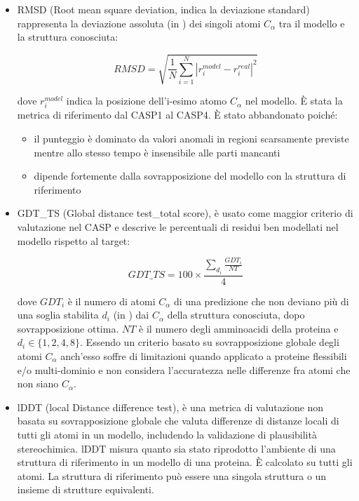 \begin{itemize}
	\item RMSD (Root mean square deviation, indica la deviazione standard) rappresenta la deviazione assoluta (in \angstrom) dei singoli atomi $C_{\alpha}$ tra il modello e la struttura conosciuta:
	
	\[  RMSD = \sqrt{\frac{1}{N} \sum_{i=1}^{N} \left|r_{i}^{model}-r_{i}^{real}\right|^{2}}  \]
	
	dove $r_{i}^{model}$ indica la posizione dell'i-esimo atomo $C_{\alpha}$ nel modello. È stata la metrica di riferimento dal CASP1 al CASP4. È stato abbandonato poiché:
	
	\begin{itemize}
		\item il punteggio è dominato da valori anomali in regioni scarsamente previste mentre allo stesso tempo è insensibile alle parti mancanti 
		\item dipende fortemente dalla sovrapposizione del modello con la struttura di riferimento
	\end{itemize}
	
	\item GDT\_TS (Global distance test\_total score), è usato come maggior criterio di valutazione nel CASP e descrive le percentuali di residui ben modellati nel modello rispetto al target:
	
	\[ GDT\_TS = 100 \times \frac{\sum_{d_{i}} \frac{GDT_{i}}{NT}} {4} \]
	
	dove $GDT_{i}$ è il numero di atomi $C_{\alpha}$ di una predizione che non deviano più di una soglia stabilita $d_{i}$ (in \angstrom) dai $C_{\alpha}$ della struttura conosciuta, dopo sovrapposizione ottima. $NT$ è il numero degli amminoacidi della proteina e $d_{i} \in \{1,2,4,8\}$. Essendo un criterio basato su sovrapposizione globale degli atomi $C_{\alpha}$ anch'esso soffre di limitazioni quando applicato a proteine flessibili e/o multi-dominio e non considera l'accuratezza nelle differenze fra atomi che non siano $C_{\alpha}$.\\
	
	\item lDDT (local Distance difference test), è una metrica di valutazione non basata su sovrapposizione globale che valuta differenze di distanze locali di tutti gli atomi in un modello, includendo la validazione di plausibilità stereochimica\supercite{mariani2013lddt}. lDDT misura quanto sia stato riprodotto l'ambiente di una struttura di riferimento in un modello di una proteina. È calcolato su tutti gli atomi. La struttura di riferimento può essere una singola struttura o un insieme di strutture equivalenti. 
	

\end{itemize}
